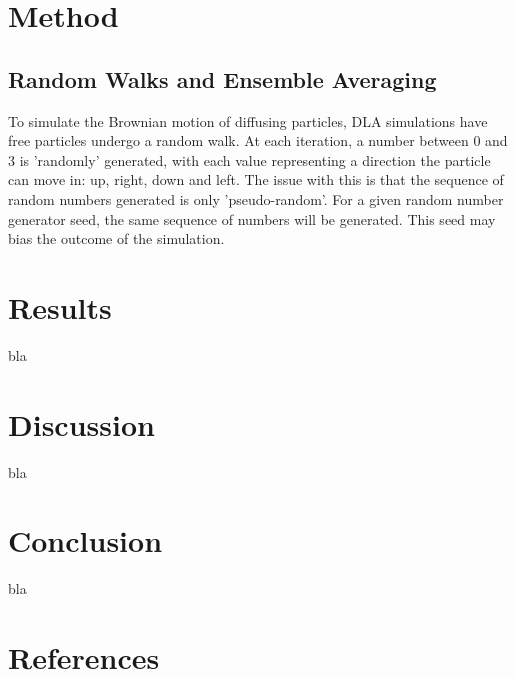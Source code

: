 \documentclass[11pt]{iopart}
\begin{document}
\section{Method}
\subsection{Random Walks and Ensemble Averaging}
To simulate the Brownian motion of diffusing particles, DLA simulations have free particles undergo a random walk. At each iteration, a number between 0 and 3 is 'randomly' generated, with each value representing a direction the particle can move in: up, right, down and left. The issue with this is that the sequence of random numbers generated is only 'pseudo-random'. For a given random number generator seed, the same sequence of numbers will be generated. This seed may bias the outcome of the simulation.

\section{Results}
bla

\section{Discussion}
bla

\section{Conclusion}
bla

\section*{References}


\end{document}
